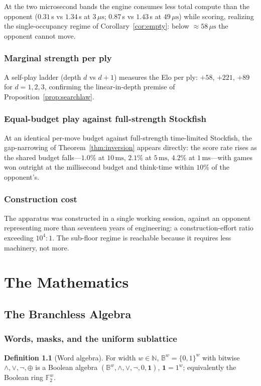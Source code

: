 \documentclass[11pt,oneside]{book}
\theoremstyle{definition}
\newtheorem{definition}{Definition}[chapter]
\theoremstyle{plain}
\theoremstyle{remark}
\newcommand{\Bits}{\mathbb{B}}
\newcommand{\Word}[1]{\Bits^{#1}}
\newcommand{\Nat}{\mathbb{N}}
\begin{document}
At the two microsecond bands the engine consumes less total compute than the opponent
($0.31$\,s vs $1.34$\,s at $3\,\mu\mathrm{s}$; $0.87$\,s vs $1.43$\,s at
$49\,\mu\mathrm{s}$) while scoring, realizing the single-occupancy regime of
Corollary~\ref{cor:empty}: below $\approx58\,\mu\mathrm{s}$ the opponent cannot move.

\section{Marginal strength per ply}
A self-play ladder (depth $d$ vs $d{+}1$) measures the Elo per ply: $+58$, $+221$, $+89$
for $d=1,2,3$, confirming the linear-in-depth premise of Proposition~\ref{prop:searchlaw}.

\section{Equal-budget play against full-strength Stockfish}
At an identical per-move budget against full-strength time-limited Stockfish, the
gap-narrowing of Theorem~\ref{thm:inversion} appears directly: the score rate rises as the
shared budget falls---$1.0\%$ at $10\,\mathrm{ms}$, $2.1\%$ at $5\,\mathrm{ms}$, $4.2\%$ at
$1\,\mathrm{ms}$---with games won outright at the millisecond budget and think-time within
$10\%$ of the opponent's.

\section{Construction cost}
The apparatus was constructed in a single working session, against an opponent representing
more than seventeen years of engineering: a construction-effort ratio exceeding
$10^{4}\!:\!1$. The sub-floor regime is reachable because it requires less machinery, not
more.

\part{The Mathematics}

\chapter{The Branchless Algebra}\label{ch:algebra}

\section{Words, masks, and the uniform sublattice}
\begin{definition}[Word algebra]
For width $w\in\Nat$, $\Word{w}=\{0,1\}^w$ with bitwise $\wedge,\vee,\neg,\oplus$ is a
Boolean algebra $(\Word{w},\wedge,\vee,\neg,0,\mathbf{1})$, $\mathbf{1}=1^w$; equivalently
the Boolean ring $\mathbb{F}_2^w$.
\end{definition}
\end{document}

